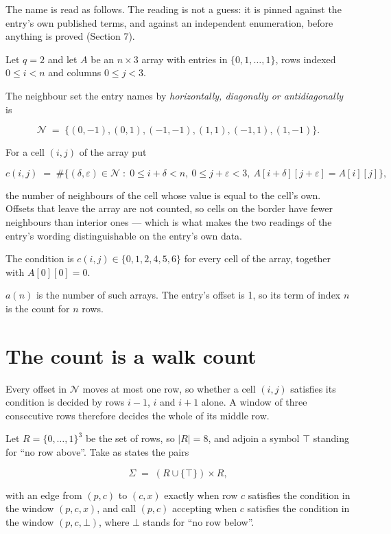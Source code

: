 \documentclass[11pt]{article}
\theoremstyle{definition}
\begin{document}
The name is read as follows. The reading is not a guess: it is pinned against the entry's own published terms, and against an independent enumeration, before anything is proved (Section 7).

Let $q = 2$ and let $A$ be an $n \times 3$ array with entries in $\{0,1,\dots,1\}$, rows indexed $0 \le i < n$ and columns $0 \le j < 3$.

The neighbour set the entry names by {\itshape horizontally, diagonally or antidiagonally} is

\[\mathcal{N} \;=\; \{(0,-1), (0,1), (-1,-1), (1,1), (-1,1), (1,-1)\}.\]

For a cell $(i,j)$ of the array put

\[c(i,j) \;=\; \#\bigl\{(\delta,\varepsilon)\in\mathcal{N} \;:\; 0\le i+\delta<n,\ 0\le j+\varepsilon<3,\ A[i+\delta][j+\varepsilon] = A[i][j]\bigr\},\]

the number of neighbours of the cell whose value is equal to the cell's own. Offsets that leave the array are not counted, so cells on the border have fewer neighbours than interior ones --- which is what makes the two readings of the entry's wording distinguishable on the entry's own data.

The condition is $c(i,j) \in \{0, 1, 2, 4, 5, 6\}$ for every cell of the array, together with $A[0][0]=0$.

$a(n)$ is the number of such arrays. The entry's offset is 1, so its term of index $n$ is the count for $n$ rows.

\section{The count is a walk count}

Every offset in $\mathcal{N}$ moves at most one row, so whether a cell $(i,j)$ satisfies its condition is decided by rows $i-1$, $i$ and $i+1$ alone. A window of three consecutive rows therefore decides the whole of its middle row.

Let $R = \{0,\dots,1\}^{3}$ be the set of rows, so $|R| = 8$, and adjoin a symbol $\top$ standing for ``no row above''. Take as states the pairs

\[\Sigma \;=\; (R \cup \{\top\}) \times R,\]

with an edge from $(p,c)$ to $(c,x)$ exactly when row $c$ satisfies the condition in the window $(p,c,x)$, and call $(p,c)$ accepting when $c$ satisfies the condition in the window $(p,c,\bot)$, where $\bot$ stands for ``no row below''.
\end{document}
